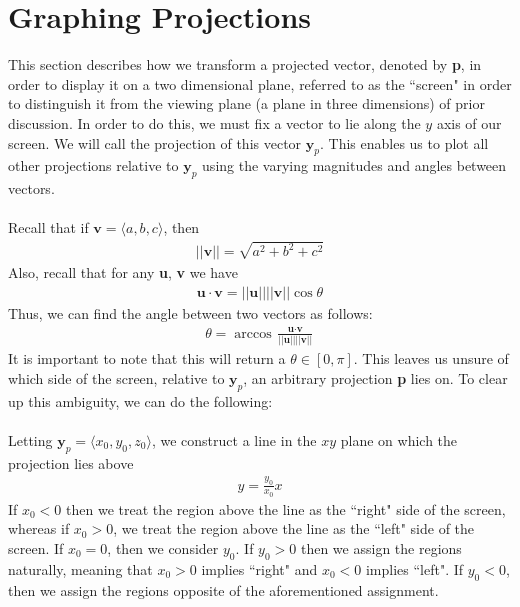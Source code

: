 \documentclass{article}
\begin{document}
\section{Graphing Projections}
This section describes how we transform a projected vector, denoted by \textbf{p}, in order to display it on a two dimensional plane, referred
to as the ``screen" in order to distinguish it from the viewing plane (a plane in three dimensions) of prior discussion.
In order to do this, we must fix a vector to lie along the $y$ axis of our screen.
We will call the projection of this vector $\textbf{y}_p$. This enables us to plot all other projections relative to $\textbf{y}_p$
using the varying magnitudes and angles between vectors.
\\\\
Recall that if $\textbf{v} = \langle a,b,c \rangle$, then
\begin{align*}
||\textbf{v}|| = \sqrt{a^2 + b^2 + c^2}
\end{align*}
Also, recall that for any \textbf{u}, \textbf{v} we have
\begin{align*}
\textbf{u} \cdot \textbf{v} = ||\textbf{u}|| ||\textbf{v}|| \cos{\theta}
\end{align*}
Thus, we can find the angle between two vectors as follows:
\begin{align*}
\theta = \arccos{\frac{\textbf{u} \cdot \textbf{v}}{||\textbf{u}|| ||\textbf{v}||}}
\end{align*}
It is important to note that this will return a $\theta \in [0,\pi]$. This leaves us unsure of which side of the screen, relative to
$\textbf{y}_p$, an arbitrary projection \textbf{p} lies on. To clear up this ambiguity, we can do the following:
\\\\
Letting $\textbf{y}_p = \langle x_{0},y_{0},z_{0} \rangle$, we construct a line in the $xy$ plane on which the projection lies above
\begin{align*}
y = \frac{y_0}{x_0}x
\end{align*}
If $x_0 < 0$ then we treat the region above the line as the ``right" side of the screen, whereas if $x_0 > 0$, we treat the region above the
line as the ``left" side of the screen. If $x_0 = 0$, then we consider $y_0$. If $y_0 > 0$ then we assign the regions naturally, meaning that
$x_0 > 0$ implies ``right" and $x_0 < 0$ implies ``left". If $y_0 < 0$, then we assign the regions opposite of the aforementioned assignment.
\\\\
\end{document}
